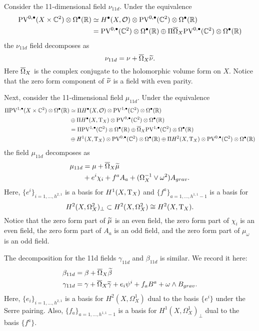 Consider the 11-dimensional field $\nu_{11d}$. 
Under the equivalence
\begin{align*}
\PV^{0,\bu}(X \times \CC^2) \otimes \Omega^\bu(\RR) & \simeq H^{\bu}(X, \cO) \otimes \PV^{0,\bu}(\CC^2) \otimes \Omega^\bu(\RR) \\ & = \PV^{0,\bu}(\CC^2) \otimes \Omega^\bu(\RR) \oplus \Pi \Bar{\Omega}_X \PV^{0,\bu}(\CC^2) \otimes \Omega^\bu(\RR) 
\end{align*}
the $\nu_{11d}$ field decomposes as 
\[ 
\nu_{11d} = \nu + \Bar{\Omega}_X \til \nu .
\]
Here $\Bar{\Omega}_X$ is the complex conjugate to the holomorphic volume form on $X$. 
Notice that the zero form component of $\til \nu$ is a field with even parity. 

Next, consider the 11-dimensional field $\mu_{11d}$. 
Under the equivalence 
\begin{align*}
\Pi \PV^{1,\bu}(X \times \CC^2) \otimes \Omega^\bu(\RR) & \simeq \Pi H^{\bu}(X, \cO) \otimes \PV^{1,\bu}(\CC^2) \otimes \Omega^\bu(\RR) \\ & \oplus \Pi H^\bu(X, \T_X) \otimes \PV^{0,\bu}(\CC^2) \otimes \Omega^\bu(\RR) \\ & = \Pi \PV^{1,\bu}(\CC^2) \otimes \Omega^\bu(\RR) \oplus \Bar{\Omega}_X \PV^{1,\bu}(\CC^2) \otimes \Omega^\bu(\RR) \\ & \oplus H^{1}(X, \T_X) \otimes \PV^{0,\bu}(\CC^2) \otimes \Omega^\bu(\RR) \oplus \Pi H^{2}(X, \T_X) \otimes \PV^{0,\bu}(\CC^2) \otimes \Omega^\bu(\RR)
\end{align*}
the field $\mu_{11d}$ decomposes as 
\begin{align*}
\mu_{11d} & = \mu + \Bar{\Omega}_X \til \mu \\ 
& + e^i \chi_i + f^a A_a +  (\Omega_X^{-1} \vee \omega^2)A_{grav} .  
\end{align*} 
Here, $\{e^i\}_{i=1,\ldots, h^{2,1}}$ is a basis for $H^{1}(X, \T_X)$ and $\{f^a\}_{a=1,\ldots, h^{1,1}-1}$ is a basis for 
\[
H^2 (X, \Omega^2_X)_\perp \subset H^2(X, \Omega^2_X) \cong H^2(X, \T_X) . 
\]
Notice that the zero form part of $\til{\mu}$ is an even field, the zero form part of $\chi_i$ is an even field, the zero form part of $A_a$ is an odd field, and the zero form part of $\mu_\omega$ is an odd field. 

The decomposition for the 11d fields $\gamma_{11d}$ and $\beta_{11d}$ is similar. 
We record it here:
\begin{align*}
\beta_{11d} & = \beta + \Bar{\Omega}_X \til \beta \\ 
\gamma_{11d} & = \gamma + \Bar{\Omega}_X \til \gamma + e_i \psi^i + f_a B^a + \omega \wedge B_{grav}  . 
\end{align*}
Here, $\{e_i\}_{i=1,\ldots,h^{2,1}}$ is a basis for $H^2 (X, \Omega^1_X)$ dual to the basis $\{e^i\}$ under the Serre pairing.
Also, $\{f_a\}_{a=1,\ldots,h^{1,1}-1}$ is a basis for $H^{1}(X, \Omega^1_X)_\perp$ dual to the basis $\{f^a\}$. 

